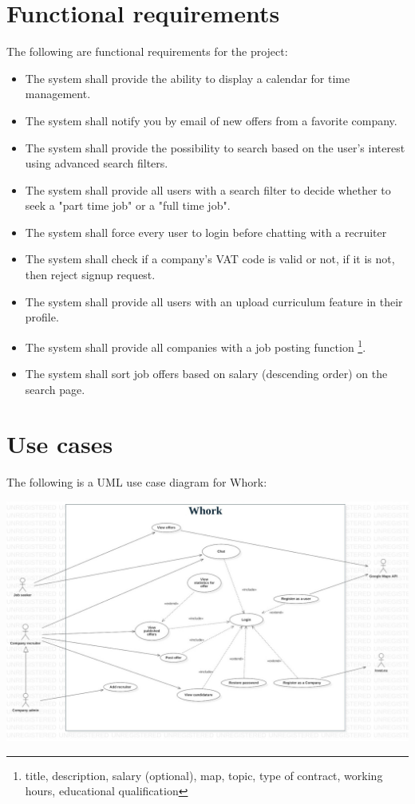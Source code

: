 \documentclass[12pt, a4paper]{article}
\begin{document}
\newpage
\section{Functional requirements}
The following are functional requirements for the project:
\begin{itemize}
	\item The system shall provide the ability to display a calendar for time management.
	\item The system shall notify you by email of new offers from a favorite company.
	\item The system shall provide the possibility to search based on the user's interest using advanced search filters.
	\item The system shall provide all users with a search filter to decide whether to seek a
	"part time job" or a "full time job".
	\item The system shall force every user to login before chatting with a recruiter
	\item The system shall check if a company's VAT code is valid or not, if it is not, then reject signup request.
	\item The system shall provide all users with an upload curriculum feature in their profile.
	\item The system shall provide all companies with a job posting function
	\footnote{title, description, salary (optional), map, topic, type of contract, working hours, educational qualification}.
	\item The system shall sort job offers based on salary (descending order) on the search page.
\end{itemize}

\newpage
\section{Use cases}
The following is a UML use case diagram for Whork:

\begin{center}
	\includegraphics{diagrams/project/usecase/usecase_scaled.jpg}
\end{center}
\end{document}
